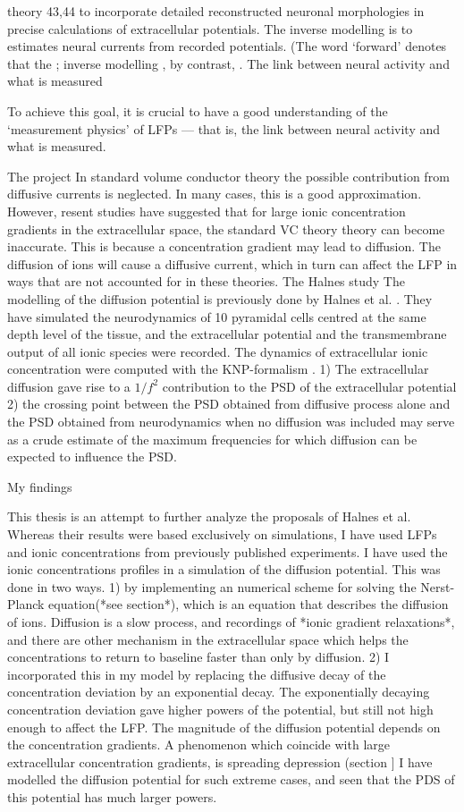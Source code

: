 \documentclass{uiophd}
\begin{document}
theory 43,44 to incorporate detailed reconstructed neuronal morphologies in precise
calculations of extracellular potentials. The inverse modelling is to estimates neural currents from recorded potentials. (The word ‘forward’ denotes that
the ; inverse modelling , by contrast,
.
 The link between neural activity and what is measured

To achieve this goal, it is crucial to have a good
understanding of the ‘measurement physics’ of LFPs
— that is, the link between neural activity and what is
measured.

{The project}
In standard volume conductor theory the possible contribution from diffusive currents is neglected. In many cases, this is a good approximation. However, resent studies have suggested that for large ionic concentration gradients in the extracellular space, the standard VC theory theory can become inaccurate. This is because a concentration gradient may lead to diffusion. The diffusion of ions will cause a diffusive current, which in turn can affect the LFP in ways that are not accounted for in these theories.  
{The Halnes study}
The modelling of the diffusion potential is previously done by Halnes et al. \cite{Halnes2016}. They have simulated the neurodynamics of 10 pyramidal cells centred at the same depth level of the tissue, and the extracellular potential and the transmembrane output of all ionic species were recorded. The dynamics of extracellular ionic concentration were computed with the KNP-formalism \cite{Halnes}.   1) The extracellular diffusion gave rise to a $1/f^2$ contribution to the PSD of the extracellular potential 2) the crossing point between the PSD obtained from diffusive process alone and the PSD obtained from neurodynamics when no diffusion was included may serve as a crude estimate of the maximum frequencies for which diffusion can be expected to influence the PSD. 

{My findings}

This thesis is an attempt to further analyze the proposals of Halnes et al. Whereas their results were based exclusively on simulations, I have used LFPs and ionic concentrations from previously published experiments. I have used the ionic concentrations profiles in a simulation of the diffusion potential. This was done in two ways. 1) by implementing an numerical scheme for solving the Nerst-Planck equation(*see section*), which is an equation that describes the diffusion of ions. Diffusion is a slow process, and recordings of *ionic gradient relaxations*, and there are other mechanism in the extracellular space which helps the concentrations to return to baseline faster than only by diffusion. 2)  I incorporated this in my model by replacing the diffusive decay of the concentration deviation by an exponential decay. The exponentially decaying concentration deviation gave higher powers of the potential, but still not high enough to affect the LFP. The magnitude of the diffusion potential depends on the concentration gradients. A phenomenon which coincide with large extracellular concentration gradients, is spreading depression (section ] I have modelled the diffusion potential for such extreme cases, and seen that the PDS of this potential has much larger powers. 
 
\end{document}
